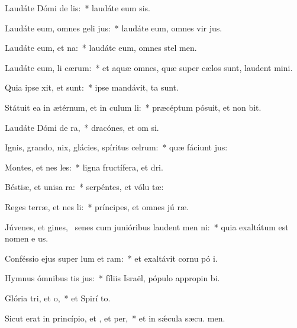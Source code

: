 \item Laudáte Dómi de lis:~* laudáte eum  sis.
\item Laudáte eum, omnes geli jus:~* laudáte eum, omnes vir jus.
\item Laudáte eum,  et na:~* laudáte eum, omnes stel  men.
\item Laudáte eum, li cærum:~* et aquæ omnes, quæ super cælos sunt, laudent  mini.
\item Quia ipse xit, et  sunt:~* ipse mandávit,  ta sunt.
\item Státuit ea in ætérnum, et in culum li:~* præcéptum pósuit, et non bit.
\item Laudáte Dómi de ra,~* dracónes, et om si.
\item Ignis, grando, nix, glácies, spíritus celrum:~* quæ fáciunt  jus:
\item Montes, et nes les:~* ligna fructífera, et  dri.
\item Béstiæ, et unisa ra:~* serpéntes, et vólu tæ:
\item Reges terræ, et nes li:~* príncipes, et omnes jú ræ.
\item Júvenes, et gines,~\pscross{} senes cum junióribus laudent men ni:~* quia exaltátum est nomen e us.
\item Conféssio ejus super lum et ram:~* et exaltávit cornu pó i.
\item Hymnus ómnibus tis jus:~* fíliis Israël, pópulo appropin bi.
\item Glória tri, et o,~* et Spirí to.
\item Sicut erat in princípio, et , et per,~* et in sǽcula sæcu. men.
